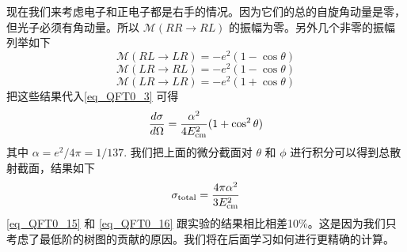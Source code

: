 现在我们来考虑电子和正电子都是右手的情况。因为它们的总的自旋角动量是零，但光子必须有角动量。所以 $\mathcal M (RR \rightarrow RL)$ 的振幅为零。另外几个非零的振幅列举如下
\begin{equation}
\mathcal M(RL\rightarrow LR) = - e^2(1-\cos\theta)  
\end{equation}
\begin{equation}
\mathcal M(LR\rightarrow RL) = - e^2 (1-\cos\theta)
\end{equation}
\begin{equation}
\mathcal M(LR \rightarrow LR) = - e^2(1+\cos\theta)
\end{equation}
把这些结果代入\autoref{eq_QFT0_3} 可得
\begin{equation}\label{eq_QFT0_15}
\frac{d\sigma}{d\Omega}  = \frac{\alpha^2}{4E_{\rm cm}^2}(1+\cos^2\theta) 
\end{equation} 
其中 $\alpha = e^2/4\pi=1/137$. 我们把上面的微分截面对 $\theta$ 和 $\phi$ 进行积分可以得到总散射截面，结果如下
\begin{equation}\label{eq_QFT0_16}
\sigma_{\rm total} = \frac{4\pi \alpha^2}{3E_{\rm cm}^2}
\end{equation}
\autoref{eq_QFT0_15} 和 \autoref{eq_QFT0_16} 跟实验的结果相比相差10\%。这是因为我们只考虑了最低阶的树图的贡献的原因。我们将在后面学习如何进行更精确的计算。




























